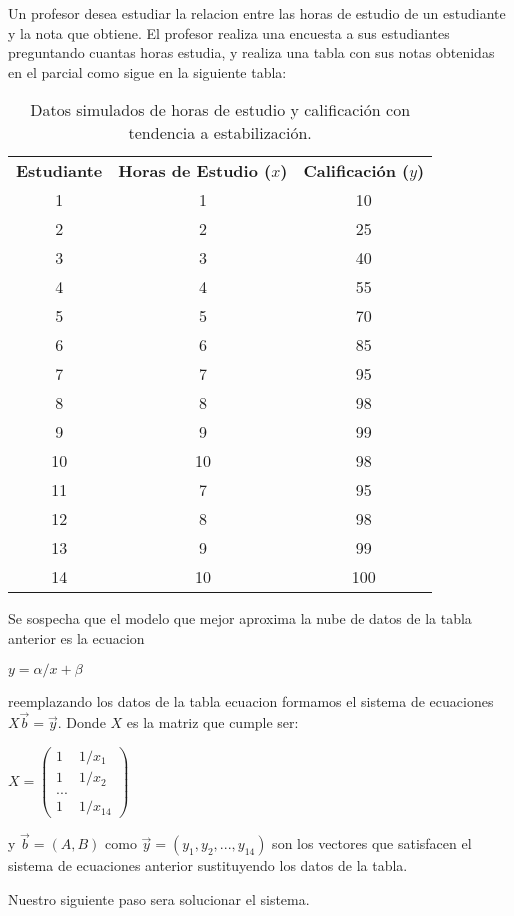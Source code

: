\documentclass{article}
\begin{document}
Un profesor desea estudiar la relacion entre las horas de estudio de un estudiante y la nota que obtiene. El profesor
realiza una encuesta a sus estudiantes preguntando cuantas horas estudia, y realiza una tabla con sus notas obtenidas 
en el parcial como sigue en la siguiente tabla:
\begin{table}[h!]
    \centering
    \begin{tabular}{|c|c|c|}
    \hline
    \textbf{Estudiante} & \textbf{Horas de Estudio (\(x\))} & \textbf{Calificación (\(y\))} \\
    1  & 1  & 10   \\ \hline 
    2  & 2  & 25   \\ \hline
    3  & 3  & 40   \\ \hline
    4  & 4  & 55   \\ \hline
    5  & 5  & 70   \\ \hline
    6  & 6  & 85   \\ \hline
    7  & 7  & 95   \\ \hline
    8  & 8  & 98   \\ \hline
    9  & 9  & 99   \\ \hline
    10 & 10 & 98  \\ \hline
    11  & 7  & 95   \\ \hline
    12  & 8  & 98   \\ \hline
    13  & 9  & 99   \\ \hline
    14 & 10 & 100  \\ \hline
    \end{tabular}
    \caption{Datos simulados de horas de estudio y calificación con tendencia a estabilización.}
    \label{tabla:horas_estudio_aplanada}
\end{table}

Se sospecha que el modelo que mejor aproxima la nube de datos de la tabla anterior es la ecuacion

\begin{center}
    $y = \alpha /x + \beta$
\end{center}

reemplazando los datos de la tabla ecuacion formamos el sistema de ecuaciones $X \vec{b} = \vec{y}$. Donde $X$ es la matriz que cumple ser:

$ X = \begin{pmatrix} 1 & 1/x_1 \\ 1 & 1/x_2 \\ ... \\ 1 & 1/x_14 \end{pmatrix}$

y $\vec{b} = (A,B)$ como $\vec{y} = (y_1, y_2,...,y_14)$ son los vectores que satisfacen el sistema de ecuaciones anterior sustituyendo los datos
de la tabla. 

Nuestro siguiente paso sera solucionar el sistema.
\end{document}
